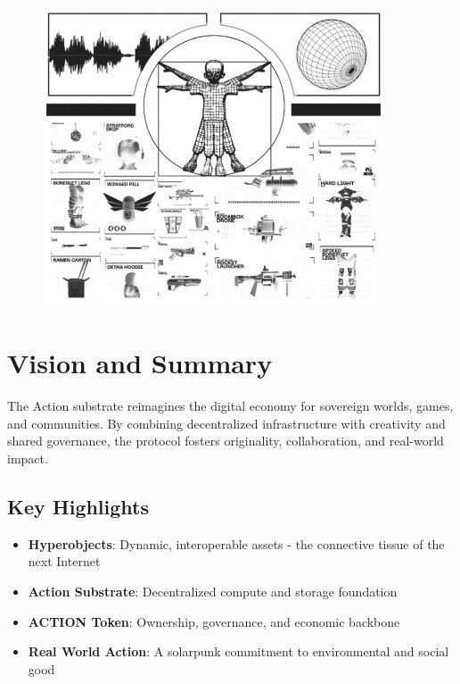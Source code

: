 
\begin{figure}[t]
  \centering
  \includegraphics[width=0.9\textwidth]{images/image15.png}
  \caption{}
  \label{fig:vision}
\end{figure}
\FloatBarrier %
\section{Vision and Summary}

The Action substrate reimagines the digital economy for sovereign worlds, games, and communities. By combining decentralized infrastructure with creativity and shared governance, the protocol fosters originality, collaboration, and real-world impact.

\subsection{Key Highlights}
\begin{itemize}
\item \textbf{Hyperobjects}: Dynamic, interoperable assets - the connective tissue of the next Internet
\item \textbf{Action Substrate}: Decentralized compute and storage foundation
\item \textbf{ACTION Token}: Ownership, governance, and economic backbone
\item \textbf{Real World Action}: A solarpunk commitment to environmental and social good
\end{itemize}


